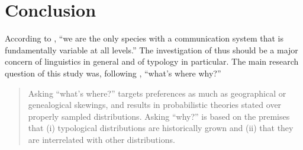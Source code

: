 \chapter{Conclusion}

According to \citet[429]{EvansLevinson2009}, “we are the only species with a communication system that is fundamentally variable at all levels.” The investigation of  thus should be a major concern of linguistics in general and of typology in particular. The main research question of this study was, following \citet[248]{Bickel2007}, “what’s where why?”

\begin{quote}
Asking “what’s where?” targets  preferences as much as geographical or genealogical skewings, and results in probabilistic theories stated over properly sampled distributions. Asking “why?” is based on the premises that (i) typological distributions are historically grown and (ii) that they are interrelated with other distributions. \citep[239]{Bickel2007}
\end{quote}

